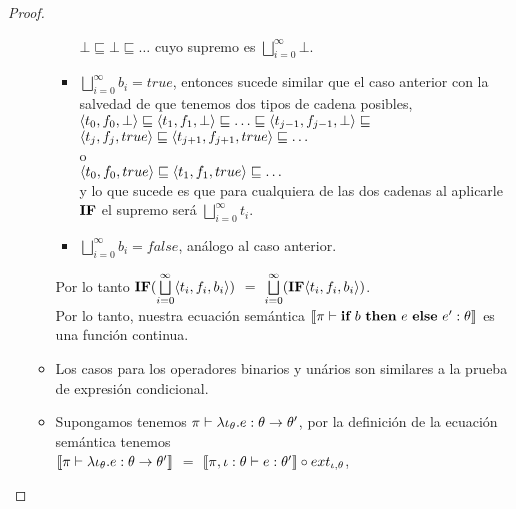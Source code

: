 \begin{proof}
\begin{itemize}
\begin{itemize}
\begin{itemize}
$\bot \sqsubseteq \bot \sqsubseteq \ldots$ cuyo supremo es $\bigsqcup\limits^{\infty}_{i=0} \bot$.\\

\item $\bigsqcup\limits^{\infty}_{i=0}b_i = true$, entonces sucede similar que el caso anterior
con la salvedad de que tenemos dos tipos de cadena posibles,\\

$\langle t_0,f_0,\bot \rangle \sqsubseteq \langle t_1,f_1,\bot \rangle 
		\sqsubseteq \ldots \sqsubseteq \langle t_{j-1},f_{j-1},\bot \rangle \sqsubseteq $\\
$\langle t_j,f_j,true \rangle \sqsubseteq \langle t_{j+1},f_{j+1},true \rangle \sqsubseteq \ldots $\\

o \\

$\langle t_0,f_0,true \rangle \sqsubseteq \langle t_1,f_1,true \rangle \sqsubseteq \ldots$ \\

y lo que sucede es que para cualquiera de las dos cadenas al aplicarle $\textbf{IF}$ el supremo ser\'a 
$\bigsqcup\limits^{\infty}_{i=0} t_i$.

\item $\bigsqcup\limits^{\infty}_{i=0}b_i = false$, an\'alogo al caso anterior.

\end{itemize}

Por lo tanto $\textbf{IF} (\bigsqcup\limits^{\infty}_{i=0}\langle t_i,f_i,b_i \rangle)$ $=$
$\bigsqcup\limits^{\infty}_{i=0} (\textbf{IF} \langle t_i,f_i,b_i \rangle)$.\\

Por lo tanto, nuestra ecuaci\'on sem\'antica $\llbracket \pi \vdash \textbf{if} \ b \ \textbf{then} \ e \ \textbf{else} \ e' : \theta \rrbracket$ es una funci\'on continua.

\item Los casos para los operadores binarios y un\'arios son similares a la prueba
de expresi\'on condicional.

\item Supongamos tenemos $\pi \vdash \lambda \iota_{\theta} . e : \theta \rightarrow \theta'$, 
por la definici\'on de la ecuaci\'on sem\'antica tenemos \\

$\llbracket \pi \vdash \lambda \iota_{\theta} . e : \theta \rightarrow \theta' \rrbracket$ $=$
$\llbracket \pi,\iota:\theta \vdash e : \theta' \rrbracket \circ ext_{\iota,\theta}$, \\


\end{itemize}
\end{itemize}
\end{proof}
